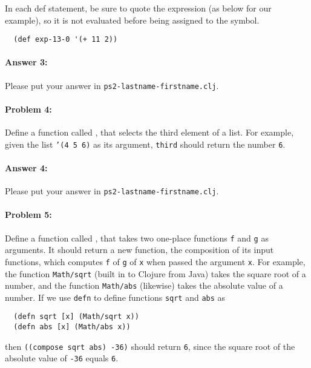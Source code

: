 \documentclass[10pt]{article}
\newcommand{\required}[1]{{\color{blue}{#1}}}
\newcommand{\PSnum}{2}
\begin{document}
In each def statement, be sure to quote the expression (as below for our
example), so it is not evaluated before being assigned to the symbol.

\begin{lstlisting}
  (def exp-13-0 '(+ 11 2))
\end{lstlisting}

\paragraph{Answer 3:} Please put your answer in
\texttt{ps\PSnum-lastname-firstname.clj}.

\noindent\hrulefill %

\paragraph{Problem 4:}
Define a function called \required{\texttt{third}}, that selects the third
element of a list. For example, given the list \texttt{'(4 5 6)} as its
argument, \texttt{third} should return the number \texttt{6}.

\paragraph{Answer 4:} Please put your answer in
\texttt{ps\PSnum-lastname-firstname.clj}.

\noindent\hrulefill %

\paragraph{Problem 5:} Define a function called \required{\texttt{compose}},
that takes two one-place functions \texttt{f} and \texttt{g} as arguments. It
should return a new function, the composition of its input functions, which
computes \texttt{f} of \texttt{g} of \texttt{x} when passed the argument
\texttt{x}. For example, the function \texttt{Math/sqrt} (built in to Clojure
from Java) takes the square root of a number, and the function \texttt{Math/abs}
(likewise)  takes the absolute value of a number. If we use \texttt{defn} to
define functions \texttt{sqrt} and \texttt{abs} as
\begin{lstlisting}
  (defn sqrt [x] (Math/sqrt x))
  (defn abs [x] (Math/abs x))
\end{lstlisting}
then \texttt{((compose sqrt abs) -36)} should return \texttt{6}, since the
square root of the absolute value of \texttt{-36} equals \texttt{6}.
\end{document}
